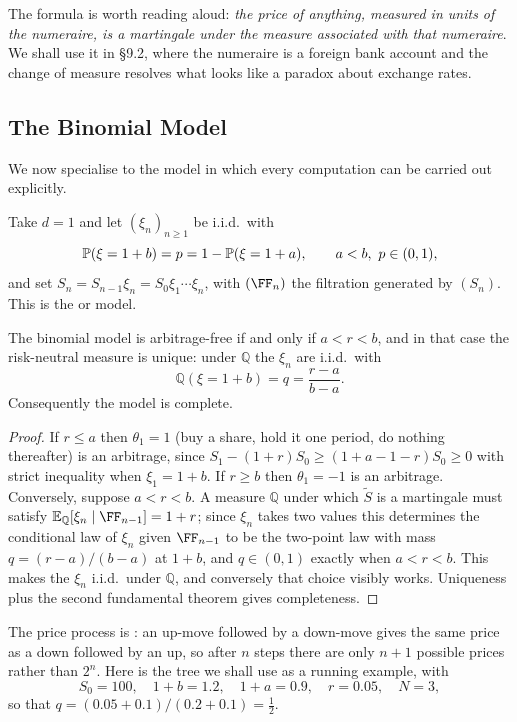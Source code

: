 \documentclass[a4paper]{scrartcl}
\newcommand{\QQ}{\mathbb{Q}}
\begin{document}
The formula is worth reading aloud: \emph{the price of anything, measured in units of the numeraire, is a martingale under the measure associated with that numeraire}. We shall use it in \S9.2, where the numeraire is a foreign bank account and the change of measure resolves what looks like a paradox about exchange rates.

\subsection{The Binomial Model}

We now specialise to the model in which every computation can be carried out explicitly.

\begin{definition}
	Take $d = 1$ and let $(\xi_n)_{n \geq 1}$ be i.i.d.\ with
	$$
	\mathbb{P}(\xi = 1+b) = p = 1 - \mathbb{P}(\xi = 1+a), \qquad a < b,\ p \in (0,1),
	$$
	and set $S_n = S_{n-1}\xi_n = S_0\xi_1\cdots\xi_n$, with $(\FF_n)$ the filtration generated by $(S_n)$. This is the  or  model.
\end{definition}

\begin{proposition}\label{prop:crr-na}
	The binomial model is arbitrage-free if and only if $a < r < b$, and in that case the risk-neutral measure is unique: under $\QQ$ the $\xi_n$ are i.i.d.\ with
	$$
	\QQ(\xi = 1+b) = q = \frac{r-a}{b-a}.
	$$
	Consequently the model is complete.
\end{proposition}

\begin{proof}
	If $r \leq a$ then $\theta_1 = 1$ (buy a share, hold it one period, do nothing thereafter) is an arbitrage, since $S_1 - (1+r)S_0 \geq (1+a-1-r)S_0\geq0$ with strict inequality when $\xi_1 = 1+b$. If $r \geq b$ then $\theta_1 = -1$ is an arbitrage. Conversely, suppose $a<r<b$. A measure $\QQ$ under which $\tilde S$ is a martingale must satisfy $\EE_\QQ[\xi_n \mid \FF_{n-1}] = 1+r$; since $\xi_n$ takes two values this determines the conditional law of $\xi_n$ given $\FF_{n-1}$ to be the two-point law with mass $q = (r-a)/(b-a)$ at $1+b$, and $q\in(0,1)$ exactly when $a<r<b$. This makes the $\xi_n$ i.i.d.\ under $\QQ$, and conversely that choice visibly works. Uniqueness plus the second fundamental theorem gives completeness.
\end{proof}

The price process is : an up-move followed by a down-move gives the same price as a down followed by an up, so after $n$ steps there are only $n+1$ possible prices rather than $2^n$. Here is the tree we shall use as a running example, with
$$
S_0 = 100,\quad 1+b = 1.2,\quad 1+a = 0.9,\quad r = 0.05,\quad N = 3,
$$
so that $q = (0.05+0.1)/(0.2+0.1) = \tfrac12$.
\end{document}
